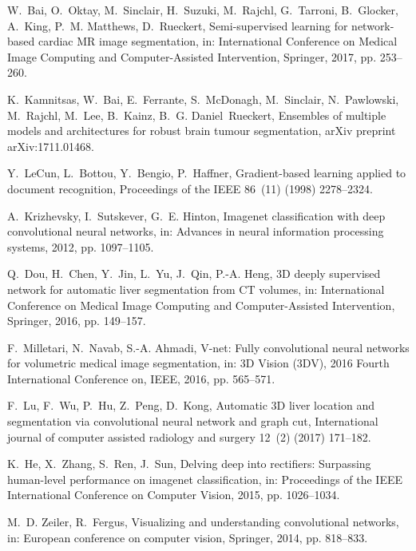 \documentclass[twoside,espcrc2]{elsarticle}
\begin{document}
\begin{thebibliography}{10}
W.~Bai, O.~Oktay, M.~Sinclair, H.~Suzuki, M.~Rajchl, G.~Tarroni, B.~Glocker,
  A.~King, P.~M. Matthews, D.~Rueckert, Semi-supervised learning for
  network-based cardiac {MR} image segmentation, in: International Conference on
  Medical Image Computing and Computer-Assisted Intervention, Springer, 2017,
  pp. 253--260.

K.~Kamnitsas, W.~Bai, E.~Ferrante, S.~McDonagh, M.~Sinclair, N.~Pawlowski,
  M.~Rajchl, M.~Lee, B.~Kainz, B.~G. Daniel~Rueckert, Ensembles of multiple
  models and architectures for robust brain tumour segmentation, arXiv preprint
  arXiv:1711.01468.

Y.~LeCun, L.~Bottou, Y.~Bengio, P.~Haffner, Gradient-based learning applied to
  document recognition, Proceedings of the IEEE 86~(11) (1998) 2278--2324.

A.~Krizhevsky, I.~Sutskever, G.~E. Hinton, Imagenet classification with deep
  convolutional neural networks, in: Advances in neural information processing
  systems, 2012, pp. 1097--1105.

Q.~Dou, H.~Chen, Y.~Jin, L.~Yu, J.~Qin, P.-A. Heng, 3{D} deeply supervised
  network for automatic liver segmentation from {CT} volumes, in: International
  Conference on Medical Image Computing and Computer-Assisted Intervention,
  Springer, 2016, pp. 149--157.

F.~Milletari, N.~Navab, S.-A. Ahmadi, V-net: {F}ully convolutional neural
  networks for volumetric medical image segmentation, in: 3D Vision (3DV), 2016
  Fourth International Conference on, IEEE, 2016, pp. 565--571.

F.~Lu, F.~Wu, P.~Hu, Z.~Peng, D.~Kong, Automatic {3D} liver location and
  segmentation via convolutional neural network and graph cut, International
  journal of computer assisted radiology and surgery 12~(2) (2017) 171--182.

K.~He, X.~Zhang, S.~Ren, J.~Sun, Delving deep into rectifiers: Surpassing
  human-level performance on imagenet classification, in: Proceedings of the
  IEEE International Conference on Computer Vision, 2015, pp. 1026--1034.

M.~D. Zeiler, R.~Fergus, Visualizing and understanding convolutional networks,
  in: European conference on computer vision, Springer, 2014, pp. 818--833.


\end{thebibliography}
\end{document}
